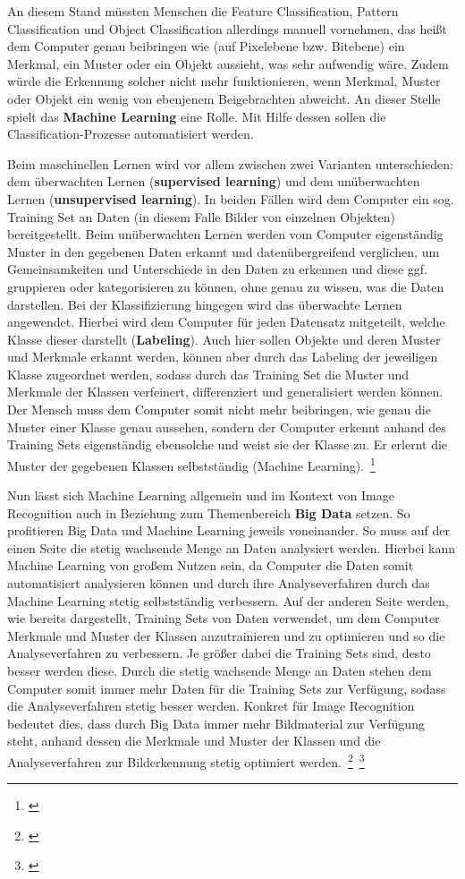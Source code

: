 An diesem Stand müssten Menschen die Feature Classification, Pattern Classification und Object Classification allerdings manuell vornehmen, das heißt dem Computer genau beibringen wie (auf Pixelebene bzw. Bitebene) ein Merkmal, ein Muster oder ein Objekt aussieht, was sehr aufwendig wäre. Zudem würde die Erkennung solcher nicht mehr funktionieren, wenn Merkmal, Muster oder Objekt ein wenig von ebenjenem Beigebrachten abweicht. An dieser Stelle spielt das \textbf{Machine Learning} eine Rolle. Mit Hilfe dessen sollen die Classification-Prozesse automatisiert werden. 

Beim maschinellen Lernen wird vor allem zwischen zwei Varianten unterschieden: dem überwachten Lernen (\textbf{supervised learning}) und dem unüberwachten Lernen (\textbf{unsupervised learning}). In beiden Fällen wird dem Computer ein sog. Training Set an Daten (in diesem Falle Bilder von einzelnen Objekten) bereitgestellt. Beim unüberwachten Lernen werden vom Computer eigenständig Muster in den gegebenen Daten erkannt und datenübergreifend verglichen, um Gemeinsamkeiten und Unterschiede in den Daten zu erkennen und diese ggf. gruppieren oder kategorisieren zu können, ohne genau zu wissen, was die Daten darstellen. Bei der Klassifizierung hingegen wird das überwachte Lernen angewendet. Hierbei wird dem Computer für jeden Datensatz mitgeteilt, welche Klasse dieser darstellt (\textbf{Labeling}). Auch hier sollen Objekte und deren Muster und Merkmale erkannt werden, können aber durch das Labeling der jeweiligen Klasse zugeordnet werden, sodass durch das Training Set die Muster und Merkmale der Klassen verfeinert, differenziert und generalisiert werden können. Der Mensch muss dem Computer somit nicht mehr beibringen, wie genau die Muster einer Klasse genau aussehen, sondern der Computer erkennt anhand des Training Sets eigenständig ebensolche und weist sie der Klasse zu. Er erlernt die Muster der gegebenen Klassen selbstständig (Machine Learning).~\footnote{\cite[S.~71--72]{Silva.2016}}

Nun lässt sich Machine Learning allgemein und im Kontext von Image Recognition auch in Beziehung zum Themenbereich \textbf{Big Data} setzen. So profitieren Big Data und Machine Learning jeweils voneinander. So muss auf der einen Seite die stetig wachsende Menge an Daten analysiert werden. Hierbei kann Machine Learning von großem Nutzen sein, da Computer die Daten somit automatisiert analysieren können und durch ihre Analyseverfahren durch das Machine Learning stetig selbstständig verbessern. Auf der anderen Seite werden, wie bereits dargestellt, Training Sets von Daten verwendet, um dem Computer Merkmale und Muster der Klassen anzutrainieren und zu optimieren und so die Analyseverfahren zu verbessern. Je größer dabei die Training Sets sind, desto besser werden diese. Durch die stetig wachsende Menge an Daten stehen dem Computer somit immer mehr Daten für die Training Sets zur Verfügung, sodass die Analyseverfahren stetig besser werden. Konkret für Image Recognition bedeutet dies, dass durch Big Data immer mehr Bildmaterial zur Verfügung steht, anhand dessen die Merkmale und Muster der Klassen und die Analyseverfahren zur Bilderkennung stetig optimiert werden.~\footnote{\cite{MollyGaletto.2018}}~\footnote{\cite{MarcoVarone.}}

